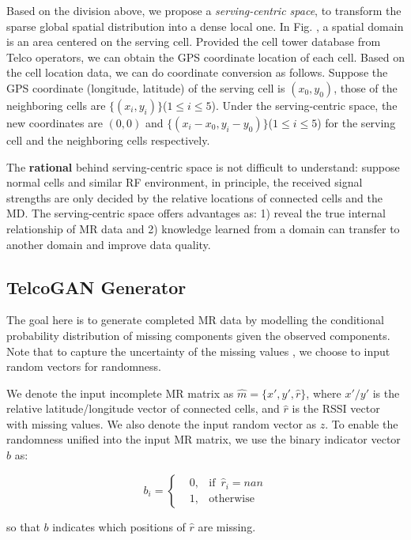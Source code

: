 Based on the division above, we propose a \emph{serving-centric space}, to transform the sparse global spatial distribution into a dense local one. In Fig. , a spatial domain is an area centered on the serving cell. Provided the cell tower database from Telco operators, we can obtain the GPS coordinate location of each cell. Based on the cell location data, we can do coordinate conversion as follows. Suppose the GPS coordinate (longitude, latitude) of the serving cell is $(x_0,y_0)$, those of the neighboring cells are $\{(x_i,y_i)\}$($1\leq i\leq 5$). Under the serving-centric space, the new coordinates are $(0,0)$ and $\{(x_i-x_0,y_i-y_0)\}$($1\leq i\leq 5$) for the serving cell and the neighboring cells respectively.

The \textbf{rational} behind serving-centric space is not difficult to understand: suppose normal cells and similar RF environment, in principle, the received signal strengths are only decided by the relative locations of connected cells and the MD. The serving-centric space offers advantages as: 1) reveal the true internal relationship of MR data and 2) knowledge learned from a domain can transfer to another domain and improve data quality.


\subsection{TelcoGAN Generator}
The goal here is to generate completed MR data by modelling the conditional probability distribution of missing components given the observed components. Note that to capture the uncertainty of the missing values \cite{buuren2010mice}, we choose to input random vectors for randomness.

We denote the input incomplete MR matrix as $\hat{m}=\{x', y', \hat{r}\}$, where $x'/y'$ is the relative latitude/longitude vector of connected cells, and $\hat{r}$ is the RSSI vector with missing values. We also denote the input random vector as $z$. To enable the randomness unified into the input MR matrix, we use the binary indicator vector $b$ as:

\begin{equation}\label{eq:b}
b_i=\left\{
\begin{aligned}
&0, &\text{if}\enspace\hat{r}_i=nan \\
&1, &\text{otherwise}
\end{aligned}
\right.
\end{equation}

so that $b$ indicates which positions of $\hat{r}$ are missing.

